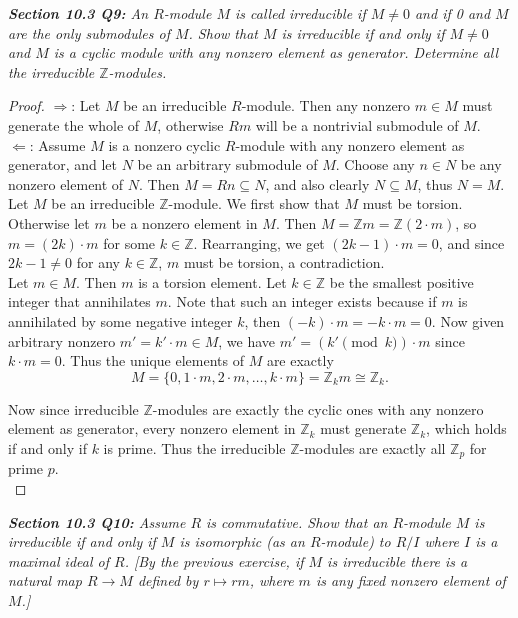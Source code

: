 \documentclass{article}
\begin{document}
\it \textbf{Section 10.3 Q9:} An $R$-module $M$ is called irreducible if
  $M\neq0$ and if 0 and $M$ are the only submodules of $M$. Show that $M$
  is irreducible if and only if $M\neq0$ and $M$ is a cyclic module with
  any nonzero element as generator. Determine all the irreducible
  $\mathbb{Z}$-modules.

  \begin{proof}
    $\Rightarrow$: Let $M$ be an irreducible $R$-module. Then any nonzero
    $m\in M$ must generate the whole of $M$, otherwise $Rm$ will be a
    nontrivial submodule of $M$. \\

    $\Leftarrow$: Assume $M$ is a nonzero cyclic $R$-module with any
    nonzero element as generator, and let $N$ be an arbitrary submodule of
    $M$. Choose any $n\in N$ be any nonzero element of $N$. Then
    $M=Rn\subseteq N$, and also clearly $N\subseteq M$, thus $N=M$. \\

    Let $M$ be an irreducible $\mathbb{Z}$-module. We first show that $M$
    must be torsion. Otherwise let $m$ be a nonzero element in $M$. Then
    $M=\mathbb{Z}m=\mathbb{Z}(2\cdot m)$, so $m=(2k)\cdot m$ for some
    $k\in\mathbb{Z}$. Rearranging, we get $(2k-1)\cdot m=0$, and since
    $2k-1\neq0$ for any $k\in\mathbb{Z}$, $m$ must be torsion, a
    contradiction. \\

    Let $m\in M$. Then $m$ is a torsion element.  Let $k\in\mathbb{Z}$ be
    the smallest positive integer that annihilates $m$. Note that such an
    integer exists because if $m$ is annihilated by some negative integer
    $k$, then $(-k)\cdot m=-k\cdot m=0$. Now given arbitrary nonzero
    $m'=k'\cdot m\in M$, we have $m'=(k'\pmod{k})\cdot m$ since $k\cdot
    m=0$. Thus the unique elements of $M$ are exactly
    \[M =\{0,1\cdot m,2\cdot m,\ldots,k\cdot m\} =\mathbb{Z}_km
    \cong\mathbb{Z}_k.\]

    Now since irreducible $\mathbb{Z}$-modules are exactly the cyclic ones
    with any nonzero element as generator, every nonzero element in
    $\mathbb{Z}_k$ must generate $\mathbb{Z}_k$, which holds if and only if
    $k$ is prime. Thus the irreducible $\mathbb{Z}$-modules are exactly all
    $\mathbb{Z}_p$ for prime $p$. \\
  \end{proof}

\it \textbf{Section 10.3 Q10:} Assume $R$ is commutative. Show that an
  $R$-module $M$ is irreducible if and only if $M$ is isomorphic (as an
  $R$-module) to $R/I$ where $I$ is a maximal ideal of $R$. [By the
  previous exercise, if $M$ is irreducible there is a natural map
  $R\rightarrow M$ defined by $r\mapsto rm$, where $m$ is any fixed nonzero
  element of $M$.]
\end{document}
